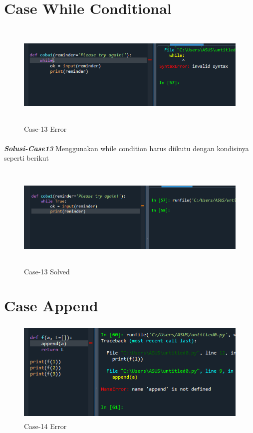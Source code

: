 \documentclass[12pt,a4paper]{article}
\begin{document}
\newpage
\section{Case While Conditional}
\begin{figure}[ht]
    \centerline{\includegraphics[width=15cm,height=5cm]{image/case13.png}}
    \renewcommand{\figurename}{Gambar}
    \caption{Case-13 Error}
\end{figure}
\paragraph{}\textbf{\textit{Solusi-Case13}} {Menggunakan while condition harus diikutu dengan kondisinya seperti berikut}
\begin{figure}[ht]
    \centerline{\includegraphics[width=15cm,height=5cm]{image/case13-solved.png}}
    \renewcommand{\figurename}{Gambar}
    \caption{Case-13 Solved}
\end{figure}

\newpage
\section{Case Append}
\begin{figure}[ht]
    \centerline{\includegraphics[width=15cm,height=5cm]{image/case14.png}}
    \renewcommand{\figurename}{Gambar}
    \caption{Case-14 Error}
\end{figure}
\end{document}
